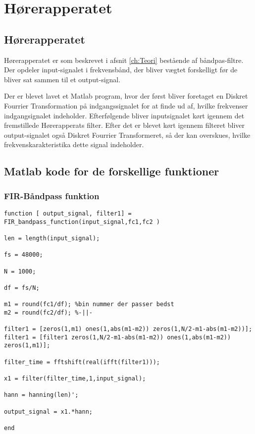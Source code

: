 \chapter{Hørerapperatet}\label{ch:Hørerapperatet}
\section{Hørerapperatet}
Hørerapperatet er som beskrevet i afsnit \ref{ch:Teori} bestående af båndpas-filtre. Der opdeler input-signalet i frekvensbånd, der bliver vægtet forskelligt før de bliver sat sammen til et output-signal.

Der er blevet lavet et Matlab program, hvor der først bliver foretaget en Diskret Fourrier Transformation på indgangssignalet for at finde ud af, hvilke frekvenser indgangsignalet indeholder.
Efterfølgende bliver inputsignalet kørt igennem det fremstillede Hørerapperats filter. Efter det er blevet kørt igennem filteret bliver output-signalet også Diskret Fourrier Transformeret, så der kan overskues, hvilke frekvenskarakteristika dette signal indeholder.
\section{Matlab kode for de forskellige funktioner}
\subsection{FIR-Båndpass funktion}
 \begin{verbatim}
function [ output_signal, filter1] = FIR_bandpass_function(input_signal,fc1,fc2 )

len = length(input_signal);

fs = 48000;

N = 1000;

df = fs/N;

m1 = round(fc1/df); %bin nummer der passer bedst
m2 = round(fc2/df); %-||-

filter1 = [zeros(1,m1) ones(1,abs(m1-m2)) zeros(1,N/2-m1-abs(m1-m2))];
filter1 = [filter1 zeros(1,N/2-m1-abs(m1-m2)) ones(1,abs(m1-m2)) zeros(1,m1)];

filter_time = fftshift(real(ifft(filter1)));

x1 = filter(filter_time,1,input_signal);

hann = hanning(len)';

output_signal = x1.*hann;

end
\end{verbatim}

